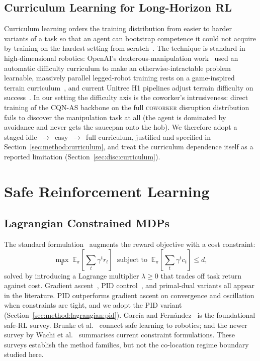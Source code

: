 \documentclass[11pt,a4paper]{report}
\newcommand{\cqnas}{CQN-AS}
\newcommand{\coworker}{\textsc{coworker}}
\begin{document}
\subsection{Curriculum Learning for Long-Horizon RL}
\label{sec:bg:rl:curriculum}

Curriculum learning orders the training distribution from easier to
harder variants of a task so that an agent can bootstrap competence
it could not acquire by training on the hardest setting from
scratch~\cite{narvekar2020curriculum}. The technique is standard in
high-dimensional robotics: OpenAI's dexterous-manipulation
work~\cite{openai2019solving} used an automatic difficulty
curriculum to make an otherwise-intractable problem learnable,
massively parallel legged-robot training rests on a game-inspired
terrain curriculum~\cite{rudin2022walkminutes}, and current Unitree
H1 pipelines adjust terrain difficulty on
success~\cite{zhuang2024parkour}. In
our setting the difficulty axis is the coworker's intrusiveness:
direct training of the \cqnas{} backbone on the full
\coworker{} disruption distribution fails to discover the
manipulation task at all (the agent is dominated by avoidance and
never gets the saucepan onto the hob). We therefore adopt a staged
idle~$\rightarrow$~easy~$\rightarrow$~full curriculum, justified and
specified in Section~\ref{sec:method:curriculum}, and treat the
curriculum dependence itself as a reported limitation
(Section~\ref{sec:disc:curriculum}).

\section{Safe Reinforcement Learning}
\label{sec:bg:safe}

\subsection{Lagrangian Constrained MDPs}
\label{sec:bg:safe:lagr}

The standard formulation~\cite{altman1999constrained,
ray2019safetygym} augments the reward objective with a cost
constraint:
\begin{equation}
  \max_{\pi} \;\mathbb{E}_{\pi}\!\left[\sum_t \gamma^t r_t\right]
  \;\;\text{subject to}\;\;
  \mathbb{E}_{\pi}\!\left[\sum_t \gamma^t c_t\right] \le d,
  \label{eq:cmdp}
\end{equation}
solved by introducing a Lagrange multiplier $\lambda \ge 0$ that
trades off task return against cost. Gradient
ascent~\cite{ray2019safetygym,achiam2017cpo}, PID
control~\cite{stooke2020pid}, and primal-dual variants all appear in
the literature. PID outperforms gradient ascent on convergence and
oscillation when constraints are tight, and we adopt the PID variant
(Section~\ref{sec:method:lagrangian:pid}). García and
Fernández~\cite{garcia2015comprehensive} is the foundational safe-RL
survey. Brunke et al.~\cite{brunke2022safelearning} connect safe
learning to robotics; and the newer survey by Wachi et
al.~\cite{wachi2024constraint} summarises current constraint
formulations. These surveys establish the method families, but not the
co-location regime boundary studied here.
\end{document}
